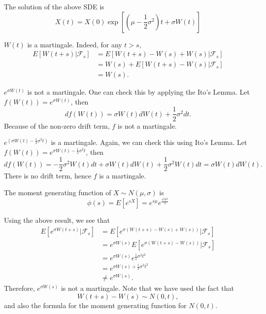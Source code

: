\documentclass{amsart}
\theoremstyle{plain}
\numberwithin{equation}{section}
\begin{document}
The solution of the above SDE is
\begin{equation}
X(t) = X(0)\exp\left[ (\mu - \frac{1}{2} \sigma^2) t + \sigma W(t)\right]
\end{equation}


$W(t)$ is a martingale. Indeed, for any $t > s$,
\begin{align*}
E[ W(t+s) | \mathcal{F}_s ] &= 
E[ W(t+s) - W(s) +  W(s) | \mathcal{F}_s ]   \\
&= W(s) + E[ W(t+s) - W(s) | \mathcal{F}_s ] \\
&= W(s).
\end{align*}

$e^{\sigma W(t)}$ is not a martingale. One can check this by applying the 
Ito's Lemma. Let $f(W(t)) = e^{\sigma W(t)}$, then
\begin{equation}
df(W(t)) = \sigma W(t)dW(t) + \frac{1}{2}\sigma^2 dt.
\end{equation}
Because of the non-zero drift term, $f$ is not a martingale.

$e^{\left(\sigma W(t) - \frac{1}{2}\sigma^2 t\right)}$ is a martingale.
Again, we can check this using Ito's Lemma. 
Let $f(W(t)) = e^{\sigma W(t)-\frac{1}{2}\sigma^2 t}$, then
\begin{equation}
df(W(t)) = -\frac{1}{2}\sigma^2 W(t) dt + \sigma W(t)dW(t) + \frac{1}{2}\sigma^2 W(t)dt
= \sigma W(t)dW(t).
\end{equation}
There is no drift term, hence $f$ is a martingale.

The moment generating function of $X \sim N(\mu, \sigma)$ is 
\begin{equation}
\phi(s) = E[ e^{sX} ] = e^{s\mu}e^{\frac{s^2\sigma^2}{2}}
\end{equation}

Using the above result, we see that
\begin{align*}
E[e^{\sigma W(t+s)} | \mathcal{F}_s] 
&= E[e^{\sigma (W(t+s) - W(s) + W(s))} | \mathcal{F}_s]\\
&= e^{\sigma W(s)}E[e^{\sigma (W(t+s) - W(s))}| \mathcal{F}_s]\\
&= e^{\sigma W(s)}e^{\frac{1}{2}\sigma^2 t^2}\\
&= e^{\sigma W(s) + \frac{1}{2}\sigma^2 t^2}\\
&\neq e^{\sigma W(s)}.
\end{align*}
Therefore, $e^{\sigma W(s)}$ is not a martingale. Note that 
we have used the fact that 
\begin{equation}
W(t+s) - W(s) \sim N(0, t), 
\end{equation}
and also the formula for the moment generating 
function for $N(0, t)$.
\end{document}
